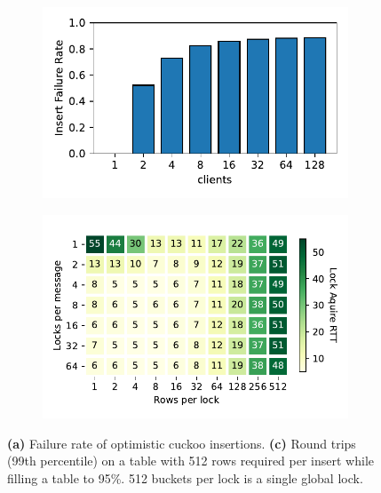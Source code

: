\begin{figure}[t]
    \centering
    \begin{subfigure}{0.3\linewidth}
        \includegraphics[width=0.99\linewidth]{fig/optimistic_failures.pdf}
    \end{subfigure}
    \begin{subfigure}{0.3\linewidth}
        \includegraphics[width=0.99\linewidth]{fig/buckets_per_lock_vs_locks_per_message.pdf}
    \end{subfigure}
    \vspace{-1em}
    \caption{
    \textbf{(a)} Failure rate of optimistic cuckoo insertions.
    \textbf{(c)} Round trips (99th percentile) on a table
    with 512 rows required per insert while filling a table
    to 95\%. 512 buckets per lock is a single global lock.}

    \label{fig:cuckoo-problems}

\end{figure}

